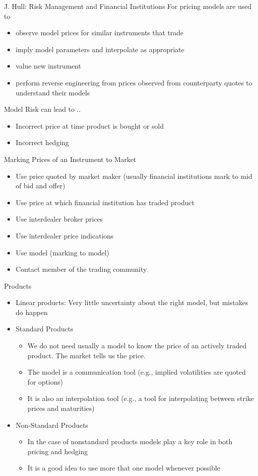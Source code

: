 {J. Hull: Risk Management and Financial Institutions}
For pricing models are used to
\begin{itemize}
\item<1-> observe model prices for similar instruments that trade
\item<2-> imply model parameters and interpolate as appropriate
\item<3-> value new instrument
\item<4-> perform reverse engineering from prices observed from counterparty quotes to understand their models
\end{itemize}
Model Risk can lead to ..
\begin{itemize}
\item<1->
Incorrect price at time product is bought or sold
\item<2-> Incorrect hedging
\end{itemize}

{Marking Prices of an Instrument to Market}
\begin{itemize}
\item<1->
Use price quoted by market maker (usually financial institutions mark to mid of bid and offer)
\item<2-> Use price at which financial institution has traded product
\item<3-> Use interdealer broker prices
\item<4-> Use interdealer price indications
\item<5-> Use model (marking to model)
\item<6-> Contact member of the trading community
\end{itemize}

{Products}
\begin{itemize}
\item<1-> Linear products: Very little uncertainty about the right model, but mistakes do happen
\item<2-> Standard Products
\begin{itemize}
\item We do not need usually a model to know the price of an actively traded product. The market tells us the price.
\item The model is a communication tool (e.g., implied volatilities are quoted for options)
\item It is also an interpolation tool (e.g., a tool for interpolating between strike prices and maturities)
\end{itemize}
\item<3-> Non-Standard Products
\begin{itemize}
\item In the case of nonstandard products models play a key role in both pricing and hedging
\item It is a good idea to use more that one model whenever possible
\end{itemize}
\end{itemize}

